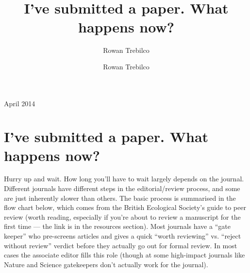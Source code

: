 \documentclass[11pt,]{article}
\author{Rowan Trebilco}
\author{}
\date{}
\begin{document}
\title{I've submitted a paper. What happens now?}

\author{Rowan Trebilco}

\maketitle

\begin{center}
    April 2014
\end{center}

\section{I've submitted a paper. What happens
now?}\label{ive-submitted-a-paper.-what-happens-now}

Hurry up and wait. How long you'll have to wait largely depends on the
journal. Different journals have different steps in the editorial/review
process, and some are just inherently slower than others. The basic
process is summarised in the flow chart below, which comes from the
British Ecological Society's guide to peer review (worth reading,
especially if you're about to review a manuscript for the first time ---
the link is in the resources section). Most journals have a ``gate
keeper'' who pre-screens articles and gives a quick ``worth reviewing''
vs. ``reject without review'' verdict before they actually go out for
formal review. In most cases the associate editor fills this role
(though at some high-impact journals like Nature and Science gatekeepers
don't actually work for the journal).
\end{document}
